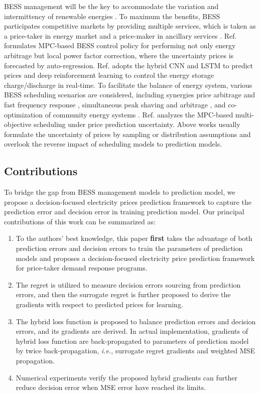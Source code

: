 \documentclass[journal]{IEEEtran}
\begin{document}
BESS management will be the key to accommodate the variation and intermittency of renewable energies \cite{Comello2019}. To maximum the benefits, BESS participates competitive markets by providing multiple services, which is taken as a price-taker in energy market and a price-maker in ancillary services \cite{Arteaga2019}. Ref. \cite{Hashmi2020} formulates MPC-based BESS control policy for performing not only energy arbitrage but local power factor correction, where the uncertainty prices is forecasted by auto-regression. Ref. \cite{Cao2020} adopts the hybrid CNN and LSTM to predict prices and deep reinforcement learning to control the energy storage charge/discharge in real-time. To facilitate the balance of energy system, various BESS scheduling scenarios are considered, including synergies price arbitrage and fast frequency response \cite{Pusceddu2021}, simultaneous peak shaving and arbitrage \cite{Schneider2021}, and co-optimization of community energy systems \cite{Terlouw2019}. Ref. \cite{Nair2021} analyzes the MPC-based multi-objective scheduling under price prediction uncertainty. Above works usually formulate the uncertainty of prices by sampling or distribution assumptions and overlook the reverse impact of scheduling models to prediction models.

\subsection{Contributions}
To bridge the gap from BESS management models to prediction model, we propose a decision-focused electricity prices prediction framework to capture the prediction error and decision error in training prediction model. Our principal contributions of this work can be summarized as:
\begin{enumerate}[\IEEEsetlabelwidth{12)}]
  \item To the authors' best knowledge, this paper  \textbf{first} takes the advantage of both prediction errors and decision errors to train the parameters of prediction models and proposes a decision-focused electricity price prediction framework for price-taker demand response programs.
  \item The regret is utilized to measure decision errors sourcing from prediction errors, and then the surrogate regret is further proposed to derive the gradients with respect to predicted prices for learning.
  \item The hybrid loss function is proposed to balance prediction errors and decision errors, and its gradients are derived. In actual implementation, gradients of hybrid loss function are back-propagated to parameters of prediction model by twice back-propagation, \textit{i.e.}, surrogate regret gradients and weighted MSE propagation.
  \item Numerical experiments verify the proposed hybrid gradients can further reduce decision error when MSE error have reached its limits.
\end{enumerate}
\end{document}
